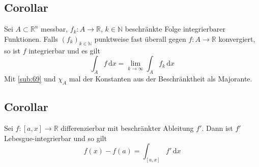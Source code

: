 \subsection[Corollar: Der Limes einer beschränkten Folge integrierbarer Funktionen ist integrierbar]{Corollar} %
\label{sub:610}
Sei $A \subset \mathds{R}^n$ messbar, $f_k : A  \to \mathds{R}$, $k \in \mathds{N}$ beschränkte Folge integrierbarer Funktionen. Falls $(f_k)_{k \in \mathds{N}}$ punktweise
fast überall gegen $f: A \to \mathds{R}$ konvergiert, so ist $f$ integrierbar und es gilt 
\[
	\int_A\! f  \, \mathrm{d}x = \lim_{ k \to \infty} \int_A\! f_k  \, \mathrm{d}x 
\]
Mit \ref{sub:69} und $\chi_A$ mal der Konstanten aus der Beschränktheit als Majorante. \bewende

\subsection[Corollar: Der Hauptsatz der Integralrechnung gilt auch für das Lebesgue-Integral]{Corollar} %
\label{sub:611}
Sei $f: [a,x] \to \mathds{R}$ differenzierbar mit beschränkter Ableitung $f'$. Dann ist $f'$ Lebesgue-integrierbar und so gilt
\[
	f(x) - f(a) = \int_{[a,x]}\! f'  \, \mathrm{d}x 
\]
